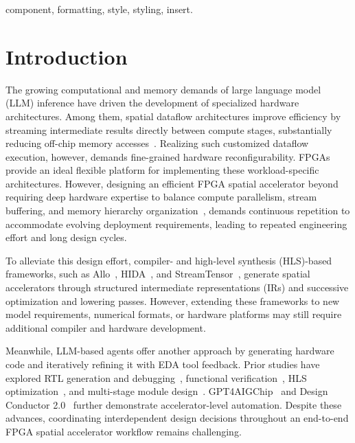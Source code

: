 \documentclass[conference]{IEEEtran}
\begin{document}
\begin{IEEEkeywords}
component, formatting, style, styling, insert.
\end{IEEEkeywords}

\section{Introduction}
The growing computational and memory demands of large language model (LLM) inference have driven the development of specialized hardware architectures. Among them, spatial dataflow architectures improve efficiency by streaming intermediate results directly between compute stages, substantially reducing off-chip memory accesses~\cite{streamtensor}. Realizing such customized dataflow execution, however, demands fine-grained hardware reconfigurability. FPGAs provide an ideal flexible platform for implementing these workload-specific architectures. However, designing an efficient FPGA spatial accelerator beyond requiring deep hardware expertise to balance compute parallelism, stream buffering, and memory hierarchy organization~\cite{allo,streamtensor}, demands continuous repetition to accommodate evolving deployment requirements, leading to repeated engineering effort and long  design cycles.

To alleviate this design effort, compiler- and high-level synthesis (HLS)-based frameworks, such as Allo~\cite{allo}, HIDA~\cite{hida}, and StreamTensor~\cite{streamtensor}, generate spatial accelerators through structured intermediate representations (IRs) and successive optimization and lowering passes. However, extending these frameworks to new model requirements, numerical formats, or hardware platforms may still require additional compiler and hardware development.

Meanwhile, LLM-based agents offer another approach by generating hardware code and iteratively refining it with EDA tool feedback. Prior studies have explored RTL generation and debugging~\cite{mage,rtlfixer}, functional verification~\cite{assertllm,correctbench}, HLS optimization~\cite{hlspilot}, and multi-stage module design~\cite{mahl}. GPT4AIGChip~\cite{gpt4aigchip} and Design Conductor 2.0~\cite{designconductor2} further demonstrate accelerator-level automation. Despite these advances, coordinating interdependent design decisions throughout an end-to-end FPGA spatial accelerator workflow remains challenging.
\end{document}
